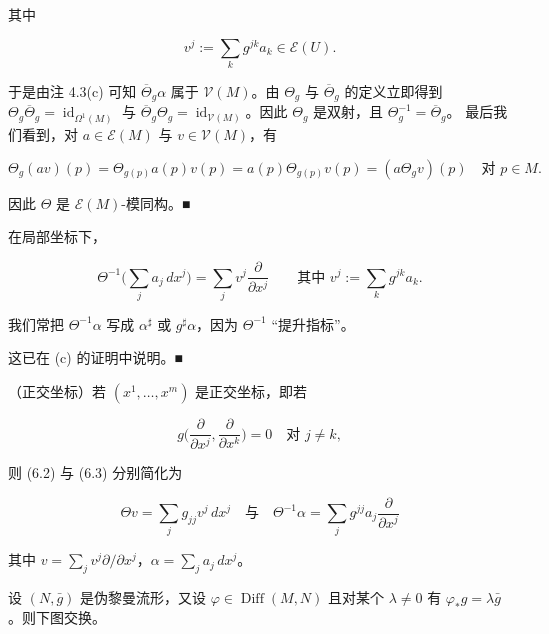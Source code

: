 \begin{remark}
\begin{items}
其中

\[
v^{j} := \sum_{k} g^{jk}a_{k} \in \mathcal{E}(U).
\]

于是由注 4.3(c) 可知 $ \overline{\Theta}_{g}\alpha $ 属于 $ \mathcal{V}(M) $。由 $ \Theta_{g} $ 与 $ \overline{\Theta}_{g} $ 的定义立即得到 $ \Theta_{g}\overline{\Theta}_{g} = \operatorname{id}_{\Omega^{1}(M)} $ 与 $ \overline{\Theta}_{g}\Theta_{g} = \operatorname{id}_{\mathcal{V}(M)} $。因此 $ \Theta_{g} $ 是双射，且 $ \Theta_{g}^{-1} = \overline{\Theta}_{g} $。
最后我们看到，对 $ a \in \mathcal{E}(M) $ 与 $ v \in \mathcal{V}(M) $，有

\[
\Theta_{g}(av)(p) = \Theta_{g(p)}a(p)v(p) = a(p)\Theta_{g(p)}v(p) = (a\Theta_{g}v)(p) \quad \text{对 } p \in M.
\]

因此 $ \Theta $ 是 $ \mathcal{E}(M) $-模同构。\nobreak\hspace{0.35em}■

\item

在局部坐标下，

\begin{equation}
\Theta^{-1}\Big(\sum_{j} a_{j}\,dx^{j}\Big) = \sum_{j} v^{j}\frac{\partial}{\partial x^{j}} \qquad \text{其中 } v^{j} := \sum_{k} g^{jk}a_{k}.\tag{6.3}
\end{equation}

我们常把 $ \Theta^{-1}\alpha $ 写成 $ \alpha^{\sharp} $ 或 $ g^{\sharp}\alpha $，因为 $ \Theta^{-1} $ “提升指标”。

\proofhead
这已在 (c) 的证明中说明。\nobreak\hspace{0.35em}■
\item

（正交坐标）若 $ (x^{1}, \dots, x^{m}) $ 是正交坐标，即若

\[
g\Big(\frac{\partial}{\partial x^{j}}, \frac{\partial}{\partial x^{k}}\Big) = 0 \quad \text{对 } j \neq k,
\]

则 (6.2) 与 (6.3) 分别简化为

\[
\Theta v = \sum_{j} g_{jj}v^{j}\,dx^{j} \quad \text{与} \quad \Theta^{-1}\alpha = \sum_{j} g^{jj}a_{j}\frac{\partial}{\partial x^{j}}
\]

其中 $ v = \sum_{j} v^{j}\partial/\partial x^{j} $，$ \alpha = \sum_{j} a_{j}\,dx^{j} $。

\item

设 $ (N, \bar{g}) $ 是伪黎曼流形，又设 $ \varphi \in \operatorname{Diff}(M, N) $ 且对某个 $ \lambda \neq 0 $ 有 $ \varphi_{*}g = \lambda\bar{g} $。则下图交换。


\end{items}
\end{remark}
